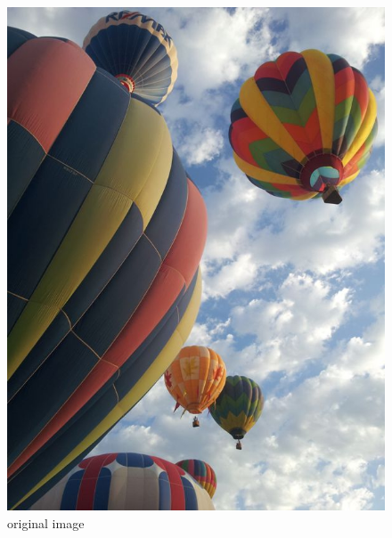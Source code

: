 \newpage
\vfill
\begin{figure}[ht]
\begin{minipage}[b]{0.45\linewidth}
\centering
\includegraphics[width=\textwidth]{baloons_resized_color.jpg}
\caption*{original image}
\end{minipage}
\hspace{0.5cm}
\begin{minipage}[b]{0.45\linewidth}
\centering

\end{minipage}
\end{figure}
